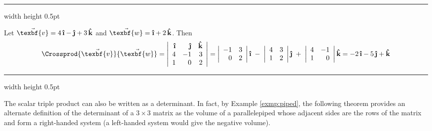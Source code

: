 \vspace{2mm}
\hrule width \textwidth height 0.5pt
\begin{exmp}
 Let $\vec{\texbf{v}} = 4\,\boldsymbol{\hat{\textbf{\i}}} - \boldsymbol{\hat{\textbf{\j}}} + 3\,\boldsymbol{\hat{\textbf{k}}}$ and $\vec{\texbf{w}} = \boldsymbol{\hat{\textbf{\i}}} + 2\,\boldsymbol{\hat{\textbf{k}}}$. Then
 \begin{displaymath}
  \Crossprod{\vec{\texbf{v}}}{\vec{\texbf{w}}} =
  \left|
  \begin{array}{rrr}
   \boldsymbol{\hat{\textbf{\i}}} & \boldsymbol{\hat{\textbf{\j}}} & \boldsymbol{\hat{\textbf{k}}}\\
   4 & -1 & 3\\
   1 & 0 & 2
  \end{array}\right|
  = \left|\begin{array}{rr} -1 & 3 \\ 0 & 2 \end{array}\right| \boldsymbol{\hat{\textbf{\i}}} \;-\;
  \left|\begin{array}{rr} 4 & 3 \\ 1 & 2 \end{array}\right| \boldsymbol{\hat{\textbf{\j}}} \;+\;
  \left|\begin{array}{rr} 4 & -1 \\ 1 & 0 \end{array}\right| \boldsymbol{\hat{\textbf{k}}}
  = -2\,\boldsymbol{\hat{\textbf{\i}}} - 5\,\boldsymbol{\hat{\textbf{\j}}} + \boldsymbol{\hat{\textbf{k}}}
 \end{displaymath}
\end{exmp}
\hrule width \textwidth height 0.5pt
\vspace{2mm}

The scalar triple product can also be written as a determinant. In fact, by Example \ref{exmp:piped}, the following
theorem provides an alternate definition of the determinant of a $3 \times 3$ matrix as the volume
of a parallelepiped whose adjacent sides are the rows of the matrix and form a right-handed system (a
left-handed system would give the negative volume).


